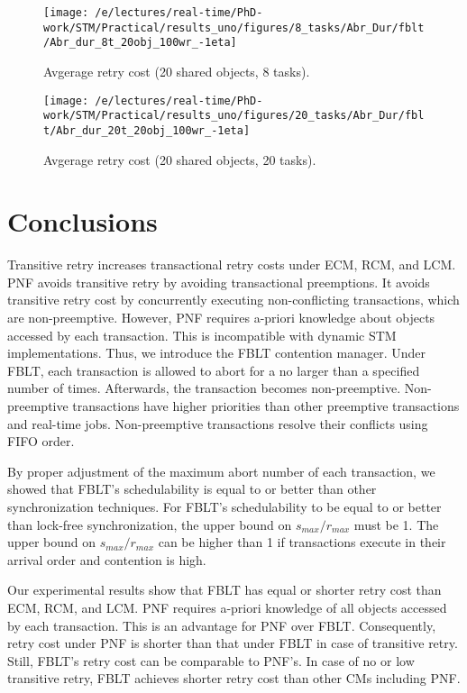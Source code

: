 \documentclass[prodmode,acmtecs]{acmsmall}
\begin{document}
\begin{compactenum}
\begin{figure}
\centering
\texttt{[image: /e/lectures/real-time/PhD-work/STM/Practical/results\_uno/figures/8\_tasks/Abr\_Dur/fblt/Abr\_dur\_8t\_20obj\_100wr\_-1eta]}
\caption{Avgerage retry cost (20 shared objects, 8 tasks).}
\label{fig-RC-fblt-8t-20obj}
\end{figure}

\begin{figure}
\centering
\texttt{[image: /e/lectures/real-time/PhD-work/STM/Practical/results\_uno/figures/20\_tasks/Abr\_Dur/fblt/Abr\_dur\_20t\_20obj\_100wr\_-1eta]}
\caption{Avgerage retry cost (20 shared objects, 20 tasks).}
\label{fig-RC-fblt-20t-20obj}
\end{figure}



\section{Conclusions}\label{conclusion}

Transitive retry increases transactional retry costs under ECM, RCM, and LCM. PNF avoids transitive retry by avoiding transactional preemptions. It avoids transitive retry cost by concurrently executing non-conflicting transactions, which are non-preemptive. However, PNF requires a-priori knowledge about objects accessed by each transaction. This is incompatible with dynamic STM implementations. Thus, we introduce the FBLT contention manager. Under  FBLT, each transaction is allowed to abort for a no larger than a specified number of times. Afterwards, the transaction becomes non-preemptive. Non-preemptive transactions have higher priorities than other preemptive transactions and real-time jobs. Non-preemptive transactions resolve their conflicts using FIFO order.

By proper adjustment of the maximum abort number of each transaction, we showed that FBLT's schedulability is equal to or better than other synchronization techniques. For FBLT's schedulability to be equal to or better than lock-free synchronization, the upper bound on $s_{max}/r_{max}$ must be 1. The upper bound on $s_{max}/r_{max}$ can be higher than 1 if transactions execute in their arrival order and contention is high.

Our experimental results show that FBLT has equal or shorter retry cost than ECM, RCM, and LCM. PNF requires a-priori knowledge of all objects accessed by each transaction. This is an advantage for PNF over FBLT. Consequently, retry cost under PNF is shorter than that under FBLT in case of transitive retry. Still, FBLT's retry cost can be comparable to PNF's. In case of no or low transitive retry, FBLT achieves shorter retry cost than other CMs including PNF.


\end{compactenum}
\end{document}
